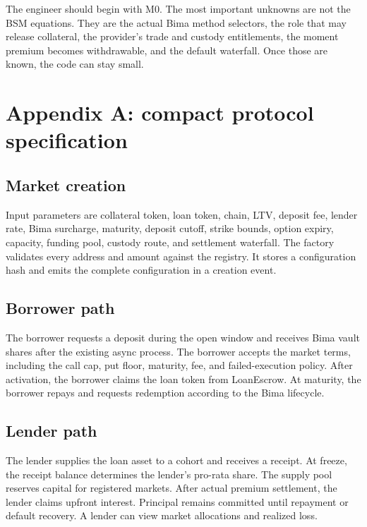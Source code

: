 \documentclass[11pt,oneside]{article}
\begin{document}
The engineer should begin with M0. The most important unknowns are not the BSM equations. They are the actual Bima method selectors, the role that may release collateral, the provider's trade and custody entitlements, the moment premium becomes withdrawable, and the default waterfall. Once those are known, the code can stay small.

\section{Appendix A: compact protocol specification}

\subsection{Market creation}

Input parameters are collateral token, loan token, chain, LTV, deposit fee, lender rate, Bima surcharge, maturity, deposit cutoff, strike bounds, option expiry, capacity, funding pool, custody route, and settlement waterfall. The factory validates every address and amount against the registry. It stores a configuration hash and emits the complete configuration in a creation event.

\subsection{Borrower path}

The borrower requests a deposit during the open window and receives Bima vault shares after the existing async process. The borrower accepts the market terms, including the call cap, put floor, maturity, fee, and failed-execution policy. After activation, the borrower claims the loan token from LoanEscrow. At maturity, the borrower repays and requests redemption according to the Bima lifecycle.

\subsection{Lender path}

The lender supplies the loan asset to a cohort and receives a receipt. At freeze, the receipt balance determines the lender's pro-rata share. The supply pool reserves capital for registered markets. After actual premium settlement, the lender claims upfront interest. Principal remains committed until repayment or default recovery. A lender can view market allocations and realized loss.
\end{document}
